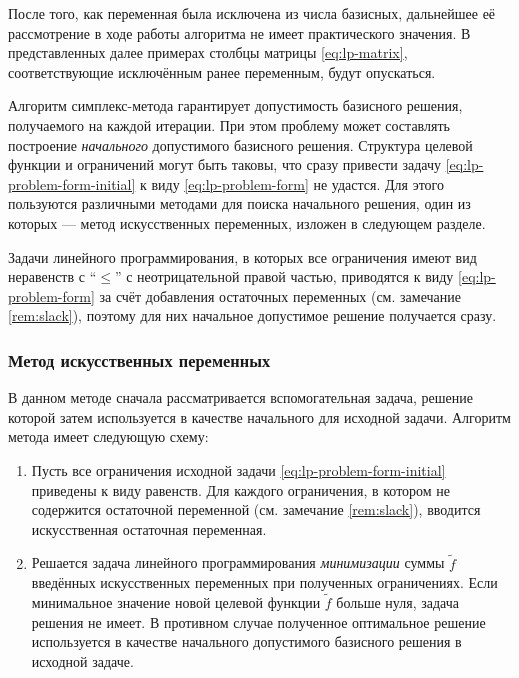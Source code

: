 \begin{rem}
  После того, как переменная была исключена из числа базисных,
  дальнейшее её рассмотрение в ходе работы алгоритма не имеет
  практического значения. В представленных далее примерах столбцы
  матрицы \eqref{eq:lp-matrix}, соответствующие исключённым ранее
  переменным, будут опускаться.
\end{rem}

Алгоритм симплекс-метода гарантирует допустимость базисного решения,
получаемого на каждой итерации. При этом проблему может составлять
построение \emph{начального} допустимого базисного решения. Структура
целевой функции и ограничений могут быть таковы, что сразу привести
задачу \eqref{eq:lp-problem-form-initial} к виду
\eqref{eq:lp-problem-form} не удастся. Для этого пользуются различными
методами для поиска начального решения, один из которых — метод
искусственных переменных, изложен в следующем разделе.

\begin{rem}
  \label{rem:slack-solution}
  Задачи линейного программирования, в которых все ограничения имеют
  вид неравенств с ``$\leq$'' с неотрицательной правой частью,
  приводятся к виду \eqref{eq:lp-problem-form} за счёт добавления
  остаточных переменных (см. замечание \ref{rem:slack}), поэтому для
  них начальное допустимое решение получается сразу.
\end{rem}

\subsubsection{Метод искусственных переменных}

В данном методе сначала рассматривается вспомогательная задача,
решение которой затем используется в качестве начального для исходной
задачи. Алгоритм метода имеет следующую схему:

\begin{enumerate}
  \renewcommand{\labelenumi}{\textbf{Шаг \arabic{enumi}.}}
\item Пусть все ограничения исходной задачи
  \eqref{eq:lp-problem-form-initial} приведены к виду равенств. Для
  каждого ограничения, в котором не содержится остаточной переменной
  (см. замечание \ref{rem:slack}), вводится искусственная остаточная
  переменная.
\item Решается задача линейного программирования \emph{минимизации}
  суммы $\tilde{f}$ введённых искусственных переменных при полученных
  ограничениях. Если минимальное значение новой целевой функции
  $\tilde{f}$ больше нуля, задача решения не имеет. В противном случае
  полученное оптимальное решение используется в качестве начального
  допустимого базисного решения в исходной задаче.
\end{enumerate}

